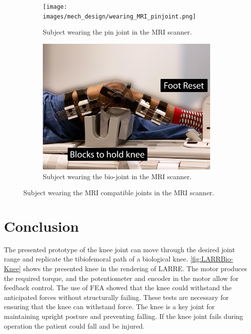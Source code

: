 \begin{figure}
    \begin{subfigure}{\textwidth}
        \centering
        \captionsetup{justification=centering}
        \texttt{[image: images/mech\_design/wearing\_MRI\_pinjoint.png]}
        \caption[Pin Joint in MRI ]{Subject wearing the pin joint in the MRI scanner.}
        \label{fig:MRIPINJoint}
    \end{subfigure}
    \begin{subfigure}{\textwidth}
        \centering
        \includegraphics[width=0.75\linewidth]{images/mech_design/wearing_MRI_bioknee.png}
          \captionsetup{justification=centering}
        \caption[Bio-joint in MRI]{Subject wearing the bio-joint in the MRI scanner.}
        \label{fig:MRIBIOJoint}
    \end{subfigure}

    \caption{Subject wearing the MRI compatible joints in the MRI scanner.}
    \label{fig:MRIKnees}
\end{figure}


  



\section{Conclusion}
The presented prototype of the knee joint can move through the desired joint range and replicate the tibiofemoral path of a biological knee. \autoref{fig:LARRBio-Knee} shows the presented knee in the rendering of LARRE. The motor produces the required torque, and the potentiometer and encoder in the motor allow for feedback control. The use of FEA showed that the knee could withstand the anticipated forces without structurally failing. These tests are necessary for ensuring that the knee can withstand force. The knee is a key joint for maintaining upright posture and preventing falling. If the knee joint fails during operation the patient could fall and be injured. 

